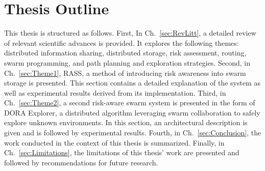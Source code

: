 \section{Thesis Outline}  %
This thesis is structured as follows. First, In Ch.~\ref{sec:RevLitt}, a detailed review of relevant scientific advances is provided. It explores the following themes: distributed information sharing, distributed storage, risk assessment, routing, swarm programming, and path planning and exploration strategies. Second, in Ch.~\ref{sec:Theme1}, RASS, a method of introducing risk awareness into swarm storage is presented. This section contains a detailed explanation of the system as well as experimental results derived from its implementation. Third, in Ch.~\ref{sec:Theme2}, a second risk-aware swarm system is presented in the form of DORA Explorer, a distributed algorithm leveraging swarm collaboration to safely explore unknown environments. In this section, an architectural description is given and is followed by experimental results. Fourth, in Ch.~\ref{sec:Conclusion}, the work conducted in the context of this thesis is summarized. Finally, in Ch.~\ref{sec:Limitations}, the limitations of this thesis' work are presented and followed by recommendations for future research.